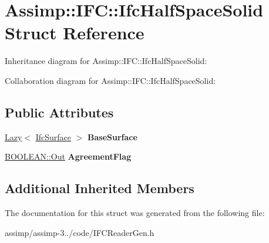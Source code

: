 \hypertarget{struct_assimp_1_1_i_f_c_1_1_ifc_half_space_solid}{\section{Assimp\+:\+:I\+F\+C\+:\+:Ifc\+Half\+Space\+Solid Struct Reference}
\label{struct_assimp_1_1_i_f_c_1_1_ifc_half_space_solid}
}


Inheritance diagram for Assimp\+:\+:I\+F\+C\+:\+:Ifc\+Half\+Space\+Solid\+:


Collaboration diagram for Assimp\+:\+:I\+F\+C\+:\+:Ifc\+Half\+Space\+Solid\+:
\subsection*{Public Attributes}
\begin{DoxyCompactItemize}
\item 
\hypertarget{struct_assimp_1_1_i_f_c_1_1_ifc_half_space_solid_a68b0b6c9136ad2b61f25461721fbb1f4}{\hyperlink{struct_assimp_1_1_s_t_e_p_1_1_lazy}{Lazy}$<$ \hyperlink{struct_assimp_1_1_i_f_c_1_1_ifc_surface}{Ifc\+Surface} $>$ {\bfseries Base\+Surface}}\label{struct_assimp_1_1_i_f_c_1_1_ifc_half_space_solid_a68b0b6c9136ad2b61f25461721fbb1f4}

\item 
\hypertarget{struct_assimp_1_1_i_f_c_1_1_ifc_half_space_solid_a43c101e7510d915bece8189480186efb}{\hyperlink{classboost_1_1shared__ptr}{B\+O\+O\+L\+E\+A\+N\+::\+Out} {\bfseries Agreement\+Flag}}\label{struct_assimp_1_1_i_f_c_1_1_ifc_half_space_solid_a43c101e7510d915bece8189480186efb}

\end{DoxyCompactItemize}
\subsection*{Additional Inherited Members}


The documentation for this struct was generated from the following file\+:\begin{DoxyCompactItemize}
\item 
assimp/assimp-\/3../code/I\+F\+C\+Reader\+Gen.\+h\end{DoxyCompactItemize}
